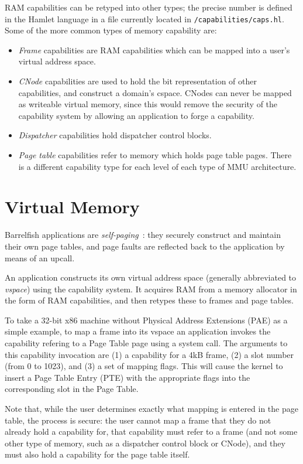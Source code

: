 \documentclass[a4paper,twoside]{report} %
\begin{document}
RAM capabilities can be retyped into other types; the precise number
is defined in the Hamlet language in a file currently located in
\texttt{/capabilities/caps.hl}.  Some of the more common types of
memory capability are:
\begin{itemize}
\item \emph{Frame} capabilities are RAM capabilities which can be
  mapped into a user's virtual address space.
\item \emph{CNode} capabilities are used to hold the bit
  representation of other capabilities, and construct a domain's
  cspace.  CNodes can never be mapped as writeable virtual memory,
  since this would remove the security of the capability system by
  allowing an application to forge a capability.
\item \emph{Dispatcher} capabilities hold dispatcher control blocks.
\item \emph{Page table} capabilities refer to memory which holds page
  table pages.  There is a different capability type for each level of
  each type of MMU architecture.
\end{itemize}

\section{Virtual Memory}

Barrelfish applications are
\emph{self-paging}~\cite{Hand:1999:SNO:296806.296812}: they securely
construct and maintain their own page tables, and page faults are
reflected back to the application by means of an upcall. 

An application constructs its own virtual address space (generally
abbreviated to \emph{vspace}) using the capability system.  It
acquires RAM from a memory allocator in the form of RAM capabilities,
and then retypes these to frames and page tables.  

To take a 32-bit x86 machine without Physical Address Extensions (PAE)
as a simple example, to map a frame into its vspace an application
invokes the capability refering to a Page Table page using a system
call.  The arguments to this capability invocation are (1) a
capability for a 4kB frame, (2) a slot number (from 0 to 1023), and
(3) a set of mapping flags.  This will cause the kernel to insert a
Page Table Entry (PTE) with the appropriate flags into the
corresponding slot in the Page Table.

Note that, while the user determines exactly what mapping is entered
in the page table, the process is secure: the user cannot map a frame
that they do not already hold a capability for, that capability must
refer to a frame (and not some other type of memory, such as a
dispatcher control block or CNode), and they must also hold a
capability for the page table itself. 
\end{document}
